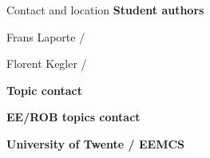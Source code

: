 \begin{frame}{Contact and location}
\small
\textbf{Student authors}\par
Frans Laporte / \LaporteEmailLink\par
Florent Kegler / \KeglerEmailLink
\vspace{3mm}

\textbf{Topic contact}\par
\TopicContactLink\par
\TopicContactEmailLink
\vspace{3mm}

\textbf{EE/ROB topics contact}\par
\EEROBContactLink\par
\EEROBContactEmailLink
\vspace{3mm}

\textbf{University of Twente / EEMCS}\par
\UTStreet\par
\UTCityCountry
\end{frame}

